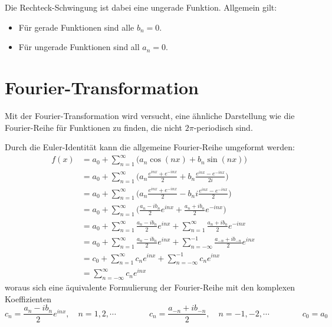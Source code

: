 			Die Rechteck-Schwingung ist dabei eine ungerade Funktion. Allgemein gilt:
			\begin{itemize}
				\item Für gerade Funktionen sind alle \( b_n = 0 \).
				\item Für ungerade Funktionen sind all \( a_n = 0 \).
			\end{itemize}

	\section{Fourier-Transformation}
		Mit der Fourier-Transformation wird versucht, eine ähnliche Darstellung wie die Fourier-Reihe für Funktionen zu finden, die nicht \(2\pi\)-periodisch sind.

		Durch die Euler-Identität kann die allgemeine Fourier-Reihe umgeformt werden:
		\begin{align*}
			f(x)
			 & = a_0 + \sum_{n = 1}^{\infty} \big( a_n \cos(nx) + b_n \sin(nx) \big)                                                   \\
			 & = a_0 + \sum_{n = 1}^{\infty} \Bigg( a_n \frac{e^{inx} + e^{-inx}}{2} + b_n \frac{e^{inx} - e^{-inx}}{2i} \Bigg)        \\
			 & = a_0 + \sum_{n = 1}^{\infty} \Bigg( a_n \frac{e^{inx} + e^{-inx}}{2} - b_n i \frac{e^{inx} - e^{-inx}}{2} \Bigg)       \\
			 & = a_0 + \sum_{n = 1}^{\infty} \Bigg( \frac{a_n - ib_n}{2} e^{inx} + \frac{a_n + ib_n}{2} e^{-inx} \Bigg)                \\
			 & = a_0 + \sum_{n = 1}^{\infty} \frac{a_n - ib_n}{2} e^{inx} + \sum_{n = 1}^{\infty} \frac{a_n + ib_n}{2} e^{-inx}        \\
			 & = a_0 + \sum_{n = 1}^{\infty} \frac{a_n - ib_n}{2} e^{inx} + \sum_{n = -\infty}^{-1} \frac{a_{-n} + ib_{-n}}{2} e^{inx} \\
			 & = c_0 + \sum_{n = 1}^{\infty} c_n e^{inx} + \sum_{n = -\infty}^{-1} c_n e^{inx}                                         \\
			 & = \sum_{n = -\infty}^{\infty} c_n e^{inx}
		\end{align*}
		woraus sich eine äquivalente Formulierung der Fourier-Reihe mit den komplexen Koeffizienten
		\begin{equation*}
			c_n = \frac{a_n - ib_n}{2} e^{inx}, \quad n = 1, 2, \cdots \quad\quad\quad\quad c_n = \frac{a_{-n} + ib_{-n}}{2}, \quad n = -1, -2, \cdots \quad\quad\quad\quad c_0 = a_0
		\end{equation*}
